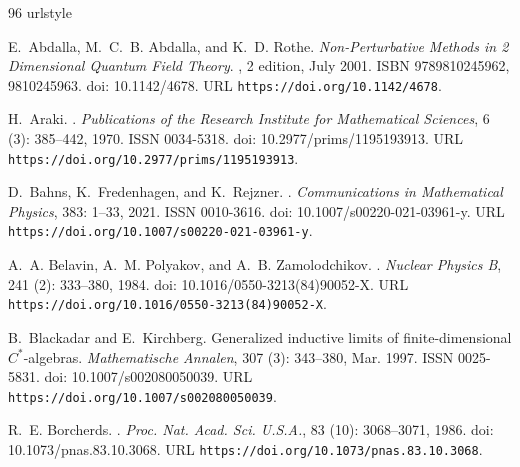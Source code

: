 \documentclass[a4paper, 11pt]{article}
\DeclareMathOperator{\1}{\mathds{1}}
\begin{document}
\begin{thebibliography}{96}
\providecommand{\natexlab}[1]{#1}
\providecommand{\url}[1]{\texttt{#1}}
\expandafter\ifx\csname urlstyle\endcsname\relax
  \providecommand{\doi}[1]{doi: #1}\else
  \providecommand{\doi}{doi: \begingroup \urlstyle{rm}\Url}\fi

E.~Abdalla, M.~C.~B. Abdalla, and K.~D. Rothe.
\newblock \emph{{Non-Perturbative Methods in 2 Dimensional Quantum Field
  Theory}}.
, 2 edition, July 2001.
\newblock ISBN 9789810245962, 9810245963.
\newblock \doi{10.1142/4678}.
\newblock URL \url{https://doi.org/10.1142/4678}.

H.~Araki.
.
\newblock \emph{Publications of the Research Institute for Mathematical
  Sciences}, 6 (3): 385--442, 1970.
\newblock ISSN 0034-5318.
\newblock \doi{10.2977/prims/1195193913}.
\newblock URL \url{https://doi.org/10.2977/prims/1195193913}.

D.~Bahns, K.~Fredenhagen, and K.~Rejzner.
.
\newblock \emph{Communications in Mathematical Physics}, 383: 1--33,
  2021.
\newblock ISSN 0010-3616.
\newblock \doi{10.1007/s00220-021-03961-y}.
\newblock URL \url{https://doi.org/10.1007/s00220-021-03961-y}.

A.~A. Belavin, A.~M. Polyakov, and A.~B. Zamolodchikov.
.
\newblock \emph{Nuclear Physics B}, 241 (2): 333--380, 1984.
\newblock \doi{10.1016/0550-3213(84)90052-X}.
\newblock URL \url{https://doi.org/10.1016/0550-3213(84)90052-X}.

B.~Blackadar and E.~Kirchberg.
\newblock Generalized inductive limits of finite-dimensional {$C^*$}-algebras.
\newblock \emph{Mathematische Annalen}, 307 (3): 343--380,
  Mar. 1997.
\newblock ISSN 0025-5831.
\newblock \doi{10.1007/s002080050039}.
\newblock URL \url{https://doi.org/10.1007/s002080050039}.

R.~E. Borcherds.
.
\newblock \emph{Proc. Nat. Acad. Sci. U.S.A.}, 83 (10):
  3068--3071, 1986.
\newblock \doi{10.1073/pnas.83.10.3068}.
\newblock URL \url{https://doi.org/10.1073/pnas.83.10.3068}.


\end{thebibliography}
\end{document}
